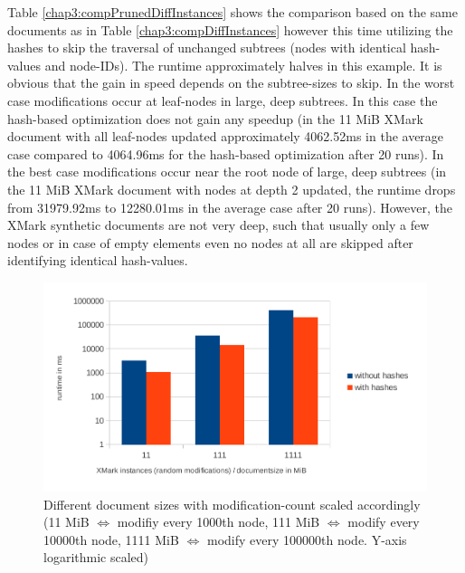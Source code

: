 Table \ref{chap3:compPrunedDiffInstances} shows the comparison based on the same documents as in Table \ref{chap3:compDiffInstances} however this time utilizing the hashes to skip the traversal of unchanged subtrees (nodes with identical hash-values and node-IDs). The runtime approximately halves in this example. It is obvious that the gain in speed depends on the subtree-sizes to skip. In the worst case modifications occur at leaf-nodes in large, deep subtrees. In this case the hash-based optimization does not gain any speedup (in the 11 MiB XMark document with all leaf-nodes updated approximately 4062.52ms in the average case compared to 4064.96ms for the hash-based optimization after 20 runs). In the best case modifications occur near the root node of large, deep subtrees (in the 11 MiB XMark document with nodes at depth 2 updated, the runtime drops from 31979.92ms to 12280.01ms in the average case after 20 runs). However, the XMark synthetic documents are not very deep, such that usually only a few nodes or in case of empty elements even no nodes at all are skipped after identifying identical hash-values.

\begin{figure}[tb]
\centering
\includegraphics[width=\textwidth]{figures/diff-docsize-scale-pruned}
\caption{Different document sizes with modification-count scaled accordingly (11 MiB $\Leftrightarrow$ modifiy every 1000th node, 111 MiB $\Leftrightarrow$ modify every 10000th node, 1111 MiB $\Leftrightarrow$ modify every 100000th node. Y-axis logarithmic scaled)} 
\label{fig:docScaling}
\end{figure}

